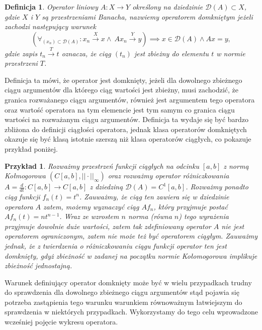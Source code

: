 \documentclass[12pt]{article}
\newtheorem{df}{Definicja}
\newtheorem{prz}{Przykład}
\begin{document}
\begin{df}
	Operator liniowy $A\colon X\to Y$ określony na dziedzinie $\mathcal{D}(A) \subset X$, gdzie $X$ i $Y$ są przestrzeniami Banacha, nazwiemy operatorem domkniętym jeżeli zachodzi następujący warunek
	\begin{displaymath}
		\left(\forall_{(x_n) \subset \mathcal{D}(A)}\colon x_n \stackrel{X}{\to}x \land \ Ax_n \stackrel{Y}{\to }y\right) \implies x\in \mathcal{D}(A) \land Ax=y,
	\end{displaymath}
	gdzie zapis $t_n\stackrel{T	}{\to} t$ oznacza, że ciąg $(t_n)$ jest zbieżny do elementu $t$ w normie przestrzeni $T$.
\end{df}
Definicja ta mówi, że operator jest domknięty, jeżeli dla dowolnego zbieżnego ciągu argumentów dla którego ciąg wartości jest zbieżny, musi zachodzić, że granica rozważanego ciągu argumentów, również jest argumentem tego operatora oraz wartość operatora na tym elemencie jest tym samym co granica ciągu wartości na rozważanym ciągu argumentów. Definicja ta wydaje się być bardzo zbliżona do definicji ciągłości operatora, jednak klasa operatorów domkniętych okazuje się być klasą istotnie szerszą niż klasa operatorów ciągłych, co pokazuje przykład poniżej.

\begin{prz}
	Rozważmy przestrzeń funkcji ciągłych na odcinku $[a,b]$ z normą Kołmogorowa $\left(C[a,b], ||\cdot||_{\infty}\right)$ oraz rozważmy operator różniczkowania $A = \frac{d}{dt}\colon C[a,b] \to C[a,b]$ z dziedziną $\mathcal{D}(A) = C^1[a,b]$. Rozważmy ponadto ciąg funkcji $f_n(t) = t^n$. Zauważmy, że ciąg ten zawiera się w dziedzinie operatora $A$ zatem, możemy wyznaczyć ciąg $Af_n$, który przyjmuje postać $Af_n(t) = nt^{n-1}$. Wraz ze wzrostem $n$ norma (równa $n$) tego wyrażenia przyjmuje dowolnie duże wartości, zatem tak zdefiniowany operator $A$ nie jest operatorem ograniczonym, zatem nie może też być operatorem ciągłym. Zauważmy jednak, że z twierdzenia o różniczkowaniu ciągu funkcji operator ten jest domknięty, gdyż zbieżność w zadanej na początku normie Kołomogorowa implikuje zbieżność jednostajną.
\end{prz}

Warunek definiujący operator domknięty może być w wielu przypadkach trudny do sprawdzenia dla dowolnego zbieżnego ciągu argumentów stąd pojawia się potrzeba zastąpienia tego warunku warunkiem równoważnym łatwiejszym do sprawdzenia w niektórych przypadkach. Wykorzystamy do tego celu wprowadzone wcześniej pojęcie wykresu operatora.
\end{document}
